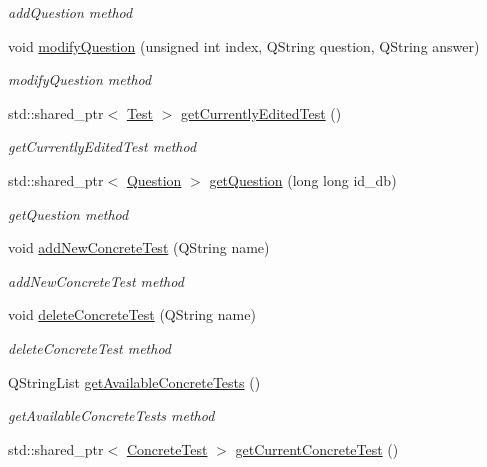 \begin{DoxyCompactItemize}
\begin{DoxyCompactList}\small\item\em add\+Question method \end{DoxyCompactList}\item 
void \hyperlink{class_main_class_ad5f52b288be1b8004edf9a3efc3bd083}{modify\+Question} (unsigned int index, Q\+String question, Q\+String answer)
\begin{DoxyCompactList}\small\item\em modify\+Question method \end{DoxyCompactList}\item 
std\+::shared\+\_\+ptr$<$ \hyperlink{class_test}{Test} $>$ \hyperlink{class_main_class_a8733164fc7f8305dc6c717a07bd8dc85}{get\+Currently\+Edited\+Test} ()
\begin{DoxyCompactList}\small\item\em get\+Currently\+Edited\+Test method \end{DoxyCompactList}\item 
std\+::shared\+\_\+ptr$<$ \hyperlink{class_question}{Question} $>$ \hyperlink{class_main_class_a6bdb47e00ec290b6c451483e07f63d80}{get\+Question} (long long id\+\_\+db)
\begin{DoxyCompactList}\small\item\em get\+Question method \end{DoxyCompactList}\item 
void \hyperlink{class_main_class_ab5b461aae89fc107477e954653e98ac0}{add\+New\+Concrete\+Test} (Q\+String name)
\begin{DoxyCompactList}\small\item\em add\+New\+Concrete\+Test method \end{DoxyCompactList}\item 
void \hyperlink{class_main_class_a829f93f30e9f001c3b6afb3f7a9d6da6}{delete\+Concrete\+Test} (Q\+String name)
\begin{DoxyCompactList}\small\item\em delete\+Concrete\+Test method \end{DoxyCompactList}\item 
Q\+String\+List \hyperlink{class_main_class_af4f98508f69bb511d03858c4193aaa90}{get\+Available\+Concrete\+Tests} ()
\begin{DoxyCompactList}\small\item\em get\+Available\+Concrete\+Tests method \end{DoxyCompactList}\item 
std\+::shared\+\_\+ptr$<$ \hyperlink{class_concrete_test}{Concrete\+Test} $>$ \hyperlink{class_main_class_ab17ab8eec8bbfadae4c5eda7cc4421cf}{get\+Current\+Concrete\+Test} ()

\end{DoxyCompactItemize}
